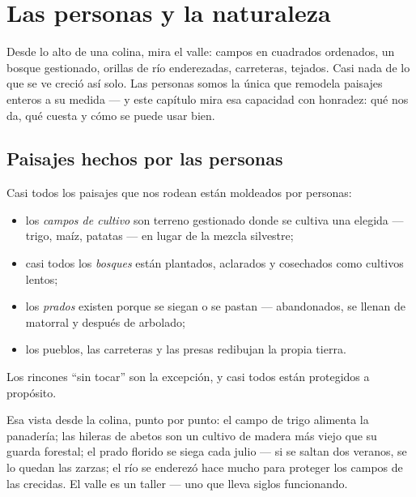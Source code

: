 \chapter{Las personas y la naturaleza}\label{ch:g5:people-and-nature}

Desde lo alto de una colina, mira el valle: campos en cuadrados
ordenados, un bosque gestionado, orillas de río enderezadas,
carreteras, tejados. Casi nada de lo que se ve creció así solo. Las
personas somos la única  que remodela paisajes enteros a su
medida --- y este capítulo mira esa capacidad con honradez: qué nos
da, qué cuesta y cómo se puede usar bien.

\section{Paisajes hechos por las personas}

\begin{proposition}\label{prop:g5:people-and-nature:managed}
Casi todos los paisajes que nos rodean están moldeados por personas:
\begin{itemize}
  \item los \emph{campos de cultivo} son
        terreno gestionado donde se cultiva una  elegida ---
        trigo, maíz, patatas --- en lugar de la mezcla silvestre;
  \item casi todos los \emph{bosques} están
        plantados, aclarados y cosechados como cultivos lentos;
  \item los \emph{prados} existen porque se siegan o se pastan ---
        abandonados, se llenan de matorral y después de arbolado;
  \item los pueblos, las carreteras y las presas redibujan la propia tierra.
\end{itemize}
Los rincones ``sin tocar'' son la excepción, y casi todos están
protegidos a propósito.
\end{proposition}
\admitted

\begin{example}\label{ex:g5:people-and-nature:valley}
Esa vista desde la colina, punto por punto: el campo de trigo alimenta
la panadería; las hileras de abetos son un cultivo de madera más viejo
que su guarda forestal; el prado florido se siega cada julio --- si se
saltan dos veranos, se lo quedan las zarzas; el río se enderezó hace
mucho para proteger los campos de las crecidas. El valle es un taller
--- uno que lleva siglos funcionando.
\end{example}

